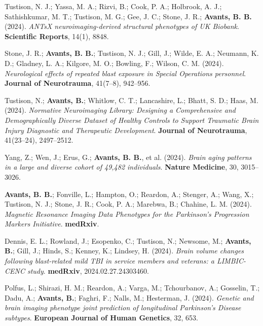 \documentclass[10pt,letterpaper]{article}
\begin{document}
\begin{enumerate}
{  %
  \item Tustison, N. J.; Yassa, M. A.; Rizvi, B.; Cook, P. A.; Holbrook, A. J.; Sathishkumar, M. T.; Tustison, M. G.; Gee, J. C.; Stone, J. R.; \textbf{Avants, B. B.} (2024). \textit{ANTsX neuroimaging-derived structural phenotypes of UK Biobank}. \textbf{Scientific Reports}, 14(1), 8848.
  \item Stone, J. R.; \textbf{Avants, B. B.}; Tustison, N. J.; Gill, J.; Wilde, E. A.; Neumann, K. D.; Gladney, L. A.; Kilgore, M. O.; Bowling, F.; Wilson, C. M. (2024). \textit{Neurological effects of repeated blast exposure in Special Operations personnel}. \textbf{Journal of Neurotrauma}, 41(7--8), 942--956.
  \item Tustison, N.; \textbf{Avants, B.}; Whitlow, C. T.; Lancashire, L.; Bhatt, S. D.; Haas, M. (2024). \textit{Normative Neuroimaging Library: Designing a Comprehensive and Demographically Diverse Dataset of Healthy Controls to Support Traumatic Brain Injury Diagnostic and Therapeutic Development}. \textbf{Journal of Neurotrauma}, 41(23--24), 2497--2512.
  \item Yang, Z.; Wen, J.; Erus, G.; \textbf{Avants, B. B.}, et al. (2024). \textit{Brain aging patterns in a large and diverse cohort of 49,482 individuals}. \textbf{Nature Medicine}, 30, 3015--3026.
  \item \textbf{Avants, B. B.}; Fonville, L.; Hampton, O.; Reardon, A.; Stenger, A.; Wang, X.; Tustison, N. J.; Stone, J. R.; Cook, P. A.; Marebwa, B.; Chahine, L. M. (2024). \textit{Magnetic Resonance Imaging Data Phenotypes for the Parkinson's Progression Markers Initiative}. \textbf{medRxiv}.
  \item Dennis, E. L.; Rowland, J.; Esopenko, C.; Tustison, N.; Newsome, M.; \textbf{Avants, B.}; Gill, J.; Hinds, S.; Kenney, K.; Lindsey, H. (2024). \textit{Brain volume changes following blast-related mild TBI in service members and veterans: a LIMBIC-CENC study}. \textbf{medRxiv}, 2024.02.27.24303460.
  \item Polfus, L.; Shirazi, H. M.; Reardon, A.; Varga, M.; Tchourbanov, A.; Gosselin, T.; Dadu, A.; \textbf{Avants, B.}; Faghri, F.; Nalls, M.; Hesterman, J. (2024). \textit{Genetic and brain imaging phenotype joint prediction of longitudinal Parkinson's Disease subtypes}. \textbf{European Journal of Human Genetics}, 32, 653.

}
\end{enumerate}
\end{document}
